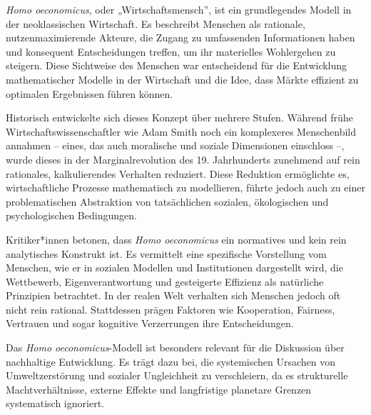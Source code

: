 \documentclass[
  nswissgerman,
  a4paper,
  DIV=11,
  numbers=noendperiod,
  oneside,
  openany]{scrreprt}
\begin{document}
\begin{tcolorbox}[enhanced jigsaw, arc=.35mm, bottomrule=.15mm, bottomtitle=1mm, breakable, colback=white, colbacktitle=quarto-callout-note-color!10!white, colframe=quarto-callout-note-color-frame, coltitle=black, left=2mm, leftrule=.75mm, opacityback=0, opacitybacktitle=0.6, rightrule=.15mm, title={Homo oeconomicus als grundlegendes Modell menschlichen Verhaltens}, titlerule=0mm, toprule=.15mm, toptitle=1mm]

\emph{Homo oeconomicus}, oder „Wirtschaftsmensch'', ist ein
grundlegendes Modell in der neoklassischen Wirtschaft. Es beschreibt
Menschen als rationale, nutzenmaximierende Akteure, die Zugang zu
umfassenden Informationen haben und konsequent Entscheidungen treffen,
um ihr materielles Wohlergehen zu steigern. Diese Sichtweise des
Menschen war entscheidend für die Entwicklung mathematischer Modelle in
der Wirtschaft und die Idee, dass Märkte effizient zu optimalen
Ergebnissen führen können.

Historisch entwickelte sich dieses Konzept über mehrere Stufen. Während
frühe Wirtschaftswissenschaftler wie Adam Smith noch ein komplexeres
Menschenbild annahmen -- eines, das auch moralische und soziale
Dimensionen einschloss --, wurde dieses in der Marginalrevolution des
19. Jahrhunderts zunehmend auf rein rationales, kalkulierendes Verhalten
reduziert. Diese Reduktion ermöglichte es, wirtschaftliche Prozesse
mathematisch zu modellieren, führte jedoch auch zu einer problematischen
Abstraktion von tatsächlichen sozialen, ökologischen und psychologischen
Bedingungen.

Kritiker*innen betonen, dass \emph{Homo oeconomicus} ein normatives und
kein rein analytisches Konstrukt ist. Es vermittelt eine spezifische
Vorstellung vom Menschen, wie er in sozialen Modellen und Institutionen
dargestellt wird, die Wettbewerb, Eigenverantwortung und gesteigerte
Effizienz als natürliche Prinzipien betrachtet. In der realen Welt
verhalten sich Menschen jedoch oft nicht rein rational. Stattdessen
prägen Faktoren wie Kooperation, Fairness, Vertrauen und sogar kognitive
Verzerrungen ihre Entscheidungen.

Das \emph{Homo oeconomicus}-Modell ist besonders relevant für die
Diskussion über nachhaltige Entwicklung. Es trägt dazu bei, die
systemischen Ursachen von Umweltzerstörung und sozialer Ungleichheit zu
verschleiern, da es strukturelle Machtverhältnisse, externe Effekte und
langfristige planetare Grenzen systematisch ignoriert.

\end{tcolorbox}
\end{document}
